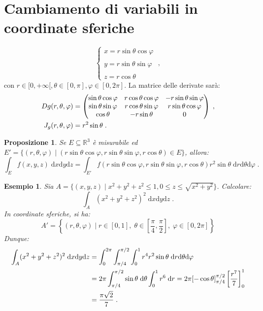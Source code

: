 \documentclass[a4paper,12pt]{report}
\theoremstyle{plain}
\newtheorem{prop}{Proposizione}[section]
\newtheorem{exm}{Esempio}[section]
\theoremstyle{definition}
\theoremstyle{remark}
\newcommand{\diff}[1]{\mathrm{d}#1}
\numberwithin{equation}{section}
\begin{document}
\section{Cambiamento di variabili in coordinate sferiche}
\begin{equation}
\begin{cases}
 x=r\sin\theta\cos\varphi \\
\\
y=r\sin\theta\sin\varphi \\
\\
z=r\cos\theta
\end{cases}\;,
\end{equation}
con $r\in [0,+\infty[,\theta\in [0,\pi],\varphi\in [0,2\pi]$. La matrice delle derivate sarà:
\begin{align}
Dg(r,\theta,\varphi)&=\left(\begin{matrix}
                            \sin\theta\cos\varphi & r\cos\theta\cos\varphi & -r\sin\theta\sin\varphi \\
\sin\theta\sin\varphi & r\cos\theta\sin\varphi & r\sin\theta\cos\varphi \\
\cos\theta & -r\sin\theta & 0
                           \end{matrix}\right)\;, \notag \\
J_g(r,\theta,\varphi)&=r^2\sin\theta\;.
\end{align}
\begin{prop} Se $E\subseteq \mathbb{R}^3$ è misurabile ed $E'=\{(r,\theta,\varphi)\;|\;(r\sin\theta\cos\varphi,r\sin\theta\sin\varphi,r\cos\theta)\in E\}$, allora:
\begin{equation}
\int_E f(x,y,z)\;\diff{x}\diff{y}\diff{z}=\int_{E'} f(r\sin\theta\cos\varphi,r\sin\theta\sin\varphi,r\cos\theta)r^2\sin\theta\;\diff{r}\diff{\theta} \diff{\varphi}\;.
\end{equation}
\end{prop}
\begin{exm} Sia $A=\{(x,y,z)\;|\;x^2+y^2+z^2\le 1,0\le z\le \sqrt{x^2+y^2}\}$. Calcolare:
\begin{equation}
\int_A (x^2+y^2+z^2)^{2}\; \diff{x}\diff{y}\diff{z}\;.
\end{equation}
In coordinate sferiche, si ha:
\begin{equation}
A'=\left\{(r,\theta,\varphi)\;|\; r\in [0,1],\; \theta\in \left[\frac{\pi}{4},\frac{\pi}{2}\right],\;\varphi\in [0,2\pi]\right\}
\end{equation}
Dunque:
\begin{align}
\int_A(x^2+y^2+z^2)^2\;\diff{x}\diff{y}\diff{z} &=\int_0^{2\pi}\int_{\pi/4}^{\pi/2}\int_0^1 r^4r^2\sin\theta\;\diff{r}\diff{\theta}\diff{\varphi} \notag \\
&=2\pi\int_{\pi/4}^{\pi/2}\sin\theta\;\diff{\theta}\int_0^1 r^6\;\diff{r}=2\pi[-\cos\theta]^{\pi/2}_{\pi/4}\left[\frac{r^7}{7}\right]^1_0 \\
&=\frac{\pi\sqrt{2}}{7}\;.
\end{align}
\end{exm}
\end{document}
